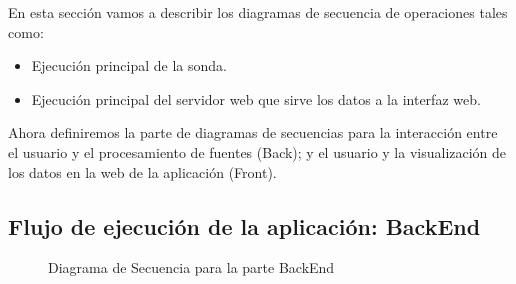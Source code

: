 En esta sección vamos a describir los diagramas de secuencia de operaciones tales como:

\begin{itemize}
\item Ejecución principal de la sonda.
\item Ejecución principal del servidor web que sirve los datos a la interfaz web.
\end{itemize}

Ahora definiremos la parte de diagramas de secuencias para la interacción entre el usuario y el procesamiento de fuentes (Back); y el usuario y la visualización de los datos en la web de la aplicación (Front).\\
\newpage
\begin{minipage}{\linewidth}
\subsection{Flujo de ejecución de la aplicación: BackEnd}
\begin{figure}[H]
\caption{Diagrama de Secuencia para la parte BackEnd}
\end{figure}
\end{minipage}
\newpage
